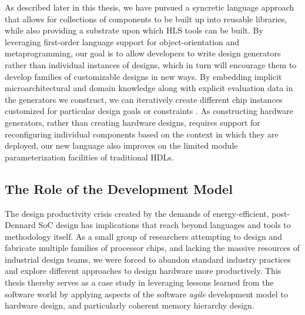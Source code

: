 As described later in this thesis, we have pursued a syncretic language approach that allows for collections of components to be built up into reusable libraries, while also providing a substrate upon which HLS tools can be built.
By leveraging first-order language support for object-orientation and metaprogramming, 
our goal is to allow developers to write design generators rather than individual instances of designs,
which in turn will encourage them to develop families of customizable designs in new ways.
By embedding implicit microarchitectural and domain knowledge along with explicit evaluation data in the generators we construct, we can iteratively create different chip instances customized for particular design goals or constraints \cite{shacham-micro10}.
As constructing hardware generators, rather than creating hardware designs, requires
support for reconfiguring individual components based on the context in which they are deployed,
our new language also improves on the limited module parameterization facilities of traditional HDLs.

\subsection{The Role of the Development Model}

The design productivity crisis created by the demands of energy-efficient, post-Dennard SoC design has implications that reach beyond
languages and tools to methodology itself.
As a small group of researchers attempting to design and fabricate multiple families of processor chips,
and lacking the massive resources of industrial design teams,
we were forced to abandon standard industry practices and explore different
approaches to design hardware more productively.
This thesis thereby serves as a case study in leveraging lessons learned from the software world by
applying aspects of the software {\em agile} development model to hardware design,
and particularly coherent memory hierarchy design.

